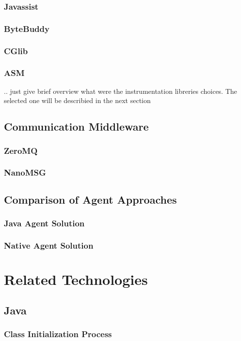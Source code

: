 \documentclass[12pt,a4paper]{report}
\begin{document}
\subsection{Javassist}
\subsection{ByteBuddy}
\subsection{CGlib}
\subsection{ASM}
.. just give brief overview what were the instrumentation libreries choices. The selected one will be describied in the next section
\section{Communication Middleware}
\subsection{ZeroMQ}
\subsection{NanoMSG}
\section{Comparison of Agent Approaches}
\subsection{Java Agent Solution}
\subsection{Native Agent Solution}


\chapter{Related Technologies}
\section{Java}
\subsection{Class Initialization Process}
\end{document}
